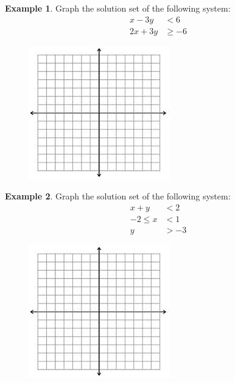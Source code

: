 \documentclass[addpoints,12pt]{exam}
\theoremstyle{definition}
\newtheorem{example}{Example}[subsection]
\begin{document}
\begin{example}
Graph the solution set of the following system:
\begin{align*}[left=\empheqlbrace]
x-3y&<6\\
 2x+3y&\ge -6
 \end{align*}
\begin{figure}[h]
\hfill\includegraphics[scale=1.25]{images/plane}
\end{figure}
\vspace{1in}
\end{example}

\newpage

\begin{example}
Graph the solution set of the following system:
\begin{align*}[left=\empheqlbrace]
x+y&<2\\
-2\le x &< 1\\
 y &> -3
 \end{align*}
\begin{figure}[h]
\hfill\includegraphics[scale=1.25]{images/plane}
\end{figure}
\vspace{1in}
\end{example}
\end{document}
